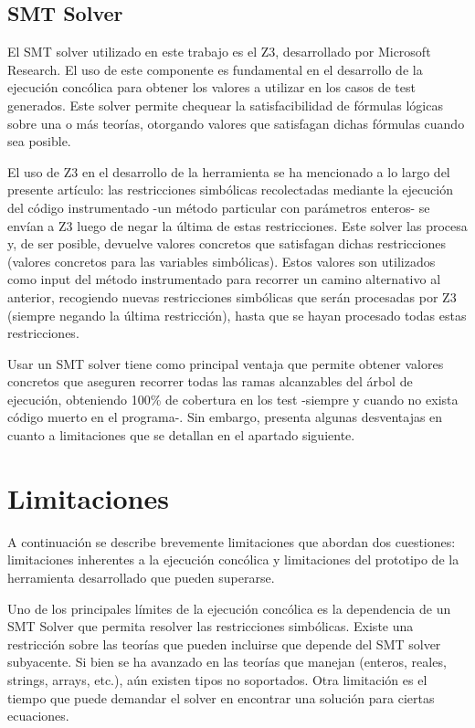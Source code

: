\documentclass{llncs}
\begin{document}
\subsection{SMT Solver}
El SMT solver utilizado en este trabajo es el Z3, desarrollado por Microsoft Research. El uso de este componente es fundamental en el desarrollo de la ejecución concólica para
obtener los valores a utilizar en los casos de test generados. Este solver permite chequear la satisfacibilidad de fórmulas lógicas sobre una o más teorías, otorgando valores que
satisfagan dichas fórmulas cuando sea posible.

El uso de Z3 en el desarrollo de la herramienta se ha mencionado a lo largo del presente artículo: las restricciones simbólicas recolectadas mediante la ejecución del código
instrumentado -un método particular con parámetros enteros- se envían a Z3 luego de negar la última de estas restricciones. Este solver las procesa y, de ser posible, devuelve
valores concretos que satisfagan dichas restricciones (valores concretos para las variables simbólicas). Estos valores son utilizados como input del método instrumentado para
recorrer un camino alternativo al anterior, recogiendo nuevas restricciones simbólicas que serán procesadas por Z3 (siempre negando la última restricción), hasta que se hayan
procesado todas estas restricciones.

Usar un SMT solver tiene como principal ventaja que permite obtener valores concretos que aseguren recorrer todas las ramas alcanzables del árbol de ejecución, obteniendo 100\%
de cobertura en los test -siempre y cuando no exista código muerto en el programa-. Sin embargo, presenta algunas desventajas en cuanto a limitaciones que se detallan en el
apartado siguiente.

\section{Limitaciones}
A continuación se describe brevemente limitaciones que abordan dos cuestiones: limitaciones inherentes a la ejecución concólica y limitaciones del prototipo de la herramienta
desarrollado que pueden superarse.

Uno de los principales límites de la ejecución concólica es la dependencia de un SMT Solver que permita resolver las restricciones simbólicas. Existe una restricción sobre las
teorías que pueden incluirse que depende del SMT solver subyacente. Si bien se ha avanzado en las teorías que manejan (enteros, reales, strings, arrays, etc.), aún existen tipos
no soportados. Otra limitación es el tiempo que puede demandar el solver en encontrar una solución para ciertas ecuaciones.
\end{document}
